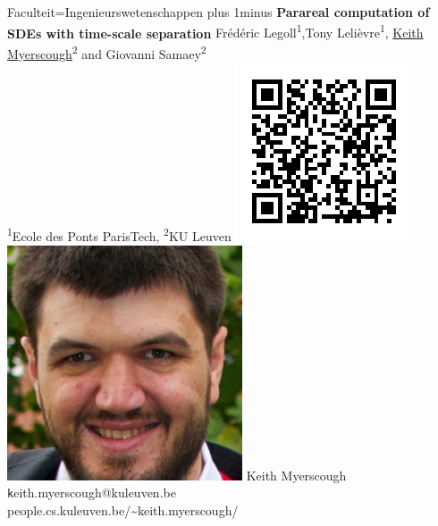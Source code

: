 \documentclass[landscape,a1paper,fontscale=0.45]{kuleuvenposter}
\begin{document}
\begin{poster}{Faculteit=Ingenieurswetenschappen} 
{ %
\font plus 1\font minus \font %
  \Huge\bfseries Parareal computation of SDEs with time-scale separation
}
{ %
  Fr\'ed\'eric Legoll\textsuperscript{1},Tony Leli\`evre\textsuperscript{1}, \underline{Keith Myerscough}\textsuperscript{2} and Giovanni Samaey\textsuperscript{2}\\
  {\footnotesize \textsuperscript{1}Ecole des Ponts ParisTech, \textsuperscript{2}KU Leuven}}
{ %
  \includegraphics[width=\footerheight]{images/qrcode}%
  \includegraphics[width=\footerheight]{images/photo.jpg}
}
{ %
  Keith Myerscough\\{\texttt keith.myerscough@kuleuven.be}\\people.cs.kuleuven.be/\~{}keith.myerscough/
}
{%
}
\end{poster}
\end{document}
